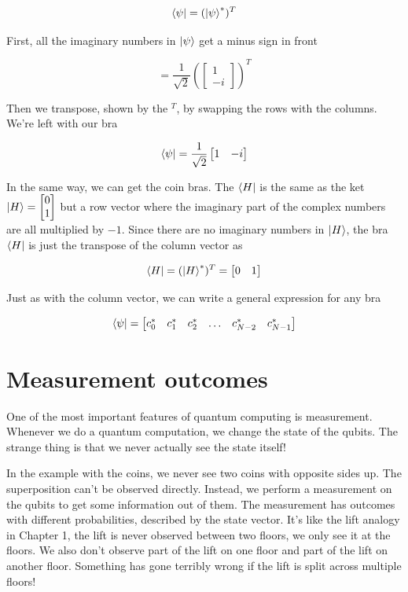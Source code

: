 $$ \bra{\psi} = (\ket{\psi}^*)^T $$

First, all the imaginary numbers in $\ket{\psi}$ get a minus sign in front 

 $$= \frac{1}{\sqrt{2}} \left(\begin{bmatrix} 1 \\ -i \end{bmatrix} \right)^T $$

Then we transpose, shown by the $^T$, by swapping the rows with the columns. We're left with our bra

$$\bra{\psi} = \frac{1}{\sqrt{2}} \begin{bmatrix} 1 & -i \end{bmatrix} $$


In the same way, we can get the coin bras. The $\bra{H}$ is the same as the ket $\ket{H} = \begin{bmatrix} 0 \\ 1 \end{bmatrix}$ but a row vector where the imaginary part of the complex numbers are all multiplied by $-1$. Since there are no imaginary numbers in $\ket{H}$, the bra $\bra{H}$ is just the transpose of the column vector as

$$
\bra{H} = (\ket{H}^*)^T = \begin{bmatrix} 0 & 1 \end{bmatrix}
$$

Just as with the column vector, we can write a general expression for any bra

$$
\bra{\psi} = \begin{bmatrix} c_0^* & c_1^* & c_2^* & \dots & c_{N-2}^* & c_{N-1}^* \end{bmatrix}
$$

\section{ Measurement outcomes}

One of the most important features of quantum computing is measurement. Whenever we do a quantum computation, we change the state of the qubits. The strange thing is that we never actually see the state itself! 

In the example with the coins, we never see two coins with opposite sides up. The superposition can't be observed directly. Instead, we perform a measurement on the qubits to get some information out of them. The measurement has outcomes with different probabilities, described by the state vector. It's like the lift analogy in Chapter 1, the lift is never observed between two floors, we only see it at the floors. We also don't observe part of the lift on one floor and part of the lift on another floor. Something has gone terribly wrong if the lift is split across multiple floors! 

